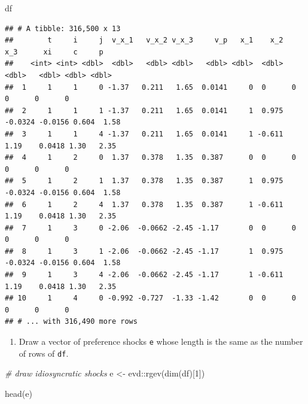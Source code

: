 \documentclass[
]{book}
\newenvironment{Shaded}{\begin{snugshade}}{\end{snugshade}}
\newcommand{\CommentTok}[1]{\textcolor[rgb]{0.56,0.35,0.01}{\textit{#1}}}
\newcommand{\DecValTok}[1]{\textcolor[rgb]{0.00,0.00,0.81}{#1}}
\newcommand{\FunctionTok}[1]{\textcolor[rgb]{0.00,0.00,0.00}{#1}}
\newcommand{\NormalTok}[1]{#1}
\newcommand{\OtherTok}[1]{\textcolor[rgb]{0.56,0.35,0.01}{#1}}
\newcommand{\SpecialCharTok}[1]{\textcolor[rgb]{0.00,0.00,0.00}{#1}}
\providecommand{\tightlist}{%
  \setlength{\itemsep}{0pt}\setlength{\parskip}{0pt}}
\begin{document}
\begin{Shaded}
\begin{Highlighting}[]
\NormalTok{df}
\end{Highlighting}
\end{Shaded}

\begin{verbatim}
## # A tibble: 316,500 x 13
##        t     i     j  v_x_1   v_x_2 v_x_3     v_p   x_1    x_2     x_3      xi     c     p
##    <int> <int> <dbl>  <dbl>   <dbl> <dbl>   <dbl> <dbl>  <dbl>   <dbl>   <dbl> <dbl> <dbl>
##  1     1     1     0 -1.37   0.211   1.65  0.0141     0  0      0       0      0      0   
##  2     1     1     1 -1.37   0.211   1.65  0.0141     1  0.975 -0.0324 -0.0156 0.604  1.58
##  3     1     1     4 -1.37   0.211   1.65  0.0141     1 -0.611  1.19    0.0418 1.30   2.35
##  4     1     2     0  1.37   0.378   1.35  0.387      0  0      0       0      0      0   
##  5     1     2     1  1.37   0.378   1.35  0.387      1  0.975 -0.0324 -0.0156 0.604  1.58
##  6     1     2     4  1.37   0.378   1.35  0.387      1 -0.611  1.19    0.0418 1.30   2.35
##  7     1     3     0 -2.06  -0.0662 -2.45 -1.17       0  0      0       0      0      0   
##  8     1     3     1 -2.06  -0.0662 -2.45 -1.17       1  0.975 -0.0324 -0.0156 0.604  1.58
##  9     1     3     4 -2.06  -0.0662 -2.45 -1.17       1 -0.611  1.19    0.0418 1.30   2.35
## 10     1     4     0 -0.992 -0.727  -1.33 -1.42       0  0      0       0      0      0   
## # ... with 316,490 more rows
\end{verbatim}

\begin{enumerate}
\def\labelenumi{\arabic{enumi}.}
\setcounter{enumi}{5}
\tightlist
\item
  Draw a vector of preference shocks \texttt{e} whose length is the same as the number of rows of \texttt{df}.
\end{enumerate}

\begin{Shaded}
\begin{Highlighting}[]
\CommentTok{\# draw idiosyncratic shocks}
\NormalTok{e }\OtherTok{\textless{}{-}}\NormalTok{ evd}\SpecialCharTok{::}\FunctionTok{rgev}\NormalTok{(}\FunctionTok{dim}\NormalTok{(df)[}\DecValTok{1}\NormalTok{])}
\end{Highlighting}
\end{Shaded}

\begin{Shaded}
\begin{Highlighting}[]
\FunctionTok{head}\NormalTok{(e)}
\end{Highlighting}
\end{Shaded}
\end{document}
